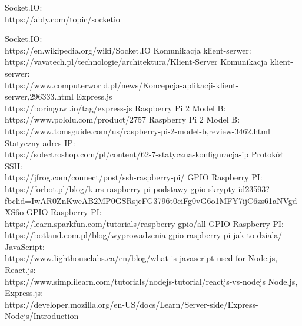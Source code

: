 \begin{thebibliography}{1}
 Socket.IO:
\\
 https://ably.com/topic/socketio

 Socket.IO:
\\
 https://en.wikipedia.org/wiki/Socket.IO
Komunikacja klient-serwer:
\\
 https://vavatech.pl/technologie/architektura/Klient-Server
 Komunikacja klient-serwer:
\\
https://www.computerworld.pl/news/Koncepcja-aplikacji-klient-serwer,296333.html
 Express.js
\\ 
https://boringowl.io/tag/express-js
Raspberry Pi 2 Model B:
\\
https://www.pololu.com/product/2757
Raspberry Pi 2 Model B:
\\
https://www.tomsguide.com/us/raspberry-pi-2-model-b,review-3462.html
 Statyczny adres IP:
\\
https://solectroshop.com/pl/content/62-7-statyczna-konfiguracja-ip
 Protokół SSH:
\\
https://jfrog.com/connect/post/ssh-raspberry-pi/
 GPIO Raspberry PI:
\\
https://forbot.pl/blog/kurs-raspberry-pi-podstawy-gpio-skrypty-id23593?fbclid=IwAR0ZnKweAB2MP0GSRsjeFG3796t0ciFg0vG6o1MFY7ijC6zs61aNVgdXS6o
 GPIO Raspberry PI:
\\
https://learn.sparkfun.com/tutorials/raspberry-gpio/all
 GPIO Raspberry PI:
\\
https://botland.com.pl/blog/wyprowadzenia-gpio-raspberry-pi-jak-to-dziala/
 JavaScript:
\\
https://www.lighthouselabs.ca/en/blog/what-is-javascript-used-for
Node.js, React.js:
\\
https://www.simplilearn.com/tutorials/nodejs-tutorial/reactjs-vs-nodejs
Node.js, Express.js:
\\
https://developer.mozilla.org/en-US/docs/Learn/Server-side/Express-Nodejs/Introduction

\end{thebibliography}


